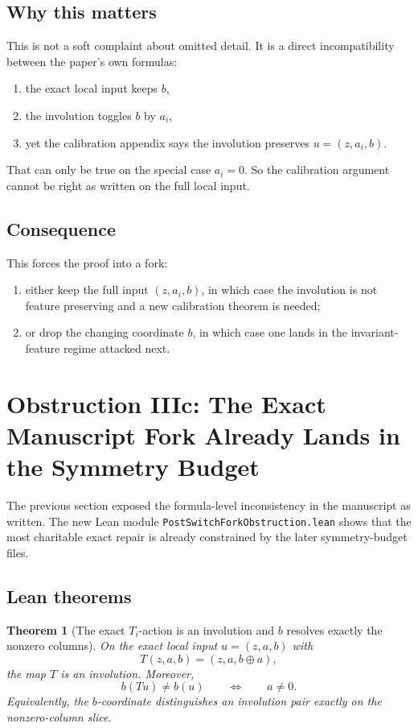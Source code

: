 \documentclass[11pt]{article}
\newtheorem{theorem}{Theorem}[section]
\theoremstyle{remark}
\begin{document}
\subsection{Why this matters}

This is not a soft complaint about omitted detail.  It is a direct incompatibility between the
paper's own formulas:
\begin{enumerate}[leftmargin=1.5em]
  \item the exact local input keeps \(b\),
  \item the involution toggles \(b\) by \(a_i\),
  \item yet the calibration appendix says the involution preserves \(u=(z,a_i,b)\).
\end{enumerate}

That can only be true on the special case \(a_i=0\).  So the calibration argument cannot be right
as written on the full local input.

\subsection{Consequence}

This forces the proof into a fork:
\begin{enumerate}[leftmargin=1.5em]
  \item either keep the full input \((z,a_i,b)\), in which case the involution is not feature
  preserving and a new calibration theorem is needed;
  \item or drop the changing coordinate \(b\), in which case one lands in the invariant-feature
  regime attacked next.
\end{enumerate}

\section{Obstruction IIIc: The Exact Manuscript Fork Already Lands in the Symmetry Budget}

The previous section exposed the formula-level inconsistency in the manuscript as written.  The new
Lean module \texttt{PostSwitchForkObstruction.lean} shows that the most charitable exact repair is
already constrained by the later symmetry-budget files.

\subsection{Lean theorems}

\begin{theorem}[The exact \(T_i\)-action is an involution and \(b\) resolves exactly the nonzero columns]
On the exact local input \(u=(z,a,b)\) with
\[
  T(z,a,b) = (z,a,b \oplus a),
\]
the map \(T\) is an involution.  Moreover,
\[
  b(Tu) \neq b(u)
  \qquad\Longleftrightarrow\qquad
  a \neq 0.
\]
Equivalently, the \(b\)-coordinate distinguishes an involution pair exactly on the nonzero-column
slice.
\end{theorem}
\end{document}
